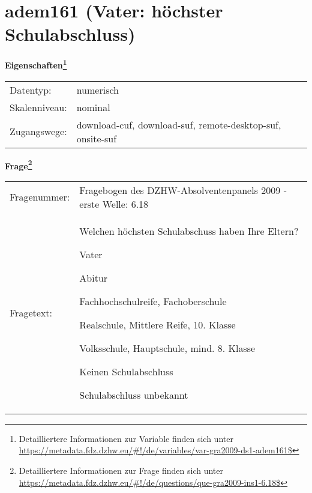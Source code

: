 
    \setcounter{footnote}{0}

    \vspace*{-1.8cm}
	\section{adem161 (Vater: höchster Schulabschluss)}
	\label{section:adem161}



    \vspace*{0.5cm}
    \noindent\textbf{Eigenschaften\footnote{Detailliertere Informationen zur Variable finden sich unter
		\url{https://metadata.fdz.dzhw.eu/\#!/de/variables/var-gra2009-ds1-adem161$}}}\\
	\begin{tabularx}{\hsize}{@{}lX}
	Datentyp: & numerisch \\
	Skalenniveau: & nominal \\
	Zugangswege: &
	  download-cuf, 
	  download-suf, 
	  remote-desktop-suf, 
	  onsite-suf
 \\
    \end{tabularx}



				\vspace*{0.5cm}
                \noindent\textbf{Frage\footnote{Detailliertere Informationen zur Frage finden sich unter
		              \url{https://metadata.fdz.dzhw.eu/\#!/de/questions/que-gra2009-ins1-6.18$}}}\\
				\begin{tabularx}{\hsize}{@{}lX}
					Fragenummer: &
					  Fragebogen des DZHW-Absolventenpanels 2009 - erste Welle:
					  6.18
 \\
					Fragetext: & Welchen höchsten Schulabschuss haben Ihre Eltern?\par  Vater\par  Abitur\par  Fachhochschulreife, Fachoberschule\par  Realschule, Mittlere Reife, 10. Klasse\par  Volksschule, Hauptschule, mind. 8. Klasse\par  Keinen Schulabschluss\par  Schulabschluss unbekannt \\
				\end{tabularx}






